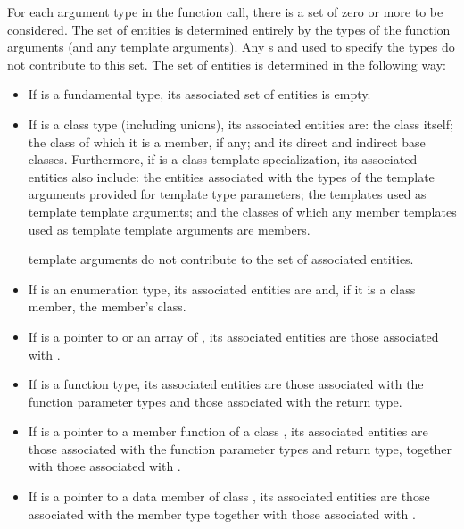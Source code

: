 \documentclass{wg21}
\begin{document}
\pnum
For each argument type  in the function call,
there is a set of zero or more 
to be considered.
The set of entities is determined entirely by
the types of the function arguments
(and any  template arguments).
Any s and 
used to specify the types
do not contribute to this set.
The set of entities
is determined in the following way:
\begin{itemize}
    \item If  is a fundamental type, its associated set of
    entities is empty.

    \item If  is a class type (including unions),
    its associated entities are:
    the class itself;
    the class of which it is a member, if any;
    and its direct and indirect base classes.
    Furthermore, if  is a class template specialization,
    its associated entities also include:
    the entities
    associated with the types of the template arguments
    provided for template type parameters;
    the templates used as  template template arguments; and
    the classes of which any member templates used as   template template
    arguments are members.
    \begin{note}
         template arguments do not
        contribute to the set of associated entities.
    \end{note}

    \item If  is an enumeration type,
    its associated entities are 
    and, if it is a class member, the member's class.

    \item If  is a pointer to  or an array of ,
    its associated entities are those associated with .

    \item If  is a function type, its associated
    entities are those associated with the function parameter types and those
    associated with the return type.

    \item If  is a pointer to a member function of a class
    , its associated entities are those associated
    with the function parameter types and return type, together with those
    associated with .

    \item If  is a pointer to a data member of class , its
    associated entities are those associated with the member
    type together with those associated with .
\end{itemize}
\end{document}
